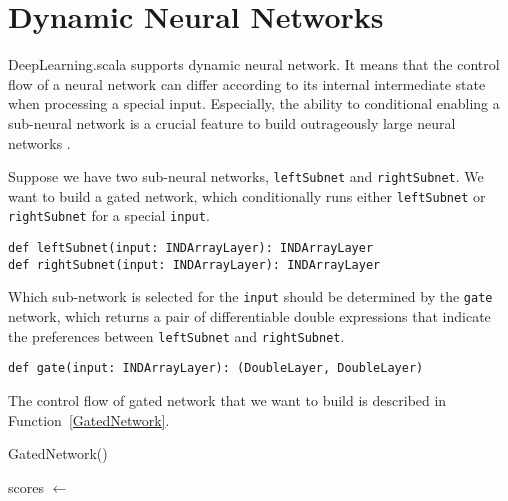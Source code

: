 \section{Dynamic Neural Networks}

DeepLearning.scala supports dynamic neural network. It means that the control flow of a neural network can differ according to its internal intermediate state when processing a special input. Especially, the ability to conditional enabling a sub-neural network is a crucial feature to build outrageously large neural networks \cite{shazeer2017outrageously}.

Suppose we have two sub-neural networks, \lstinline{leftSubnet} and \lstinline{rightSubnet}. We want to build a gated network, which conditionally runs either \lstinline{leftSubnet} or \lstinline{rightSubnet} for a special \lstinline{input}.

\begin{lstlisting}[float={h t b p},caption={Predefined sub-networks}]
def leftSubnet(input: INDArrayLayer): INDArrayLayer
def rightSubnet(input: INDArrayLayer): INDArrayLayer
\end{lstlisting}

Which sub-network is selected for the \lstinline{input} should be determined by the \lstinline{gate} network, which returns a pair of differentiable double expressions that indicate the preferences between \lstinline{leftSubnet} and \lstinline{rightSubnet}.

\begin{lstlisting}[float={h t b p},caption={Predefined gate network}]
def gate(input: INDArrayLayer): (DoubleLayer, DoubleLayer)
\end{lstlisting}

The control flow of gated network that we want to build is described in Function~\ref{GatedNetwork}.

\begin{function}[H]
  \caption{GatedNetwork()\label{GatedNetwork}}
  scores $\leftarrow$ \;
\end{function}

